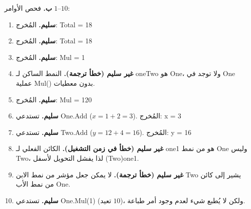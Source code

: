 \filbreak

\begin{boxSolution}
\textbf{ب.} فحص الأوامر $1$–$10$:
\begin{enumerate}[label=\textbf{\arabic*.}, itemsep=0.3em]
    \item \textbf{سليم.} المُخرج: \textenglish{Total = 18}
    \item \textbf{سليم.} المُخرج: \textenglish{Total = 18}
    \item \textbf{سليم.} المُخرج: \textenglish{Mul = 1}
    \item \textbf{غير سليم (خطأ ترجمة).} النمط الساكن لـ \textenglish{oneTwo} هو \textenglish{One}، ولا توجد في \textenglish{One} عملية \textenglish{Mul()} بدون معطيات.
    \item \textbf{سليم.} المُخرج: \textenglish{Mul = 120}
    \item \textbf{سليم.} تستدعي \textenglish{One.Add} ($x = 1 + 2 = 3$). المُخرج: \textenglish{x = 3}
    \item \textbf{سليم.} تستدعي \textenglish{Two.Add} ($y = 12 + 4 = 16$). المُخرج: \textenglish{y = 16}
    \item \textbf{غير سليم (خطأ في زمن التشغيل).} الكائن الفعلي لـ \textenglish{one1} هو من نمط \textenglish{One} وليس \textenglish{Two}، لذا يفشل التحويل لأسفل \textenglish{(Two)one1}.
    \item \textbf{غير سليم (خطأ ترجمة).} لا يمكن جعل مؤشر من نمط الابن \textenglish{Two} يشير إلى كائن من نمط الأب \textenglish{One}.
    \item \textbf{سليم.} تستدعي \textenglish{One.Mul(1)} (تعيد $10$)، ولكن لا يُطبع شيء لعدم وجود أمر طباعة.
\end{enumerate}
\end{boxSolution}
\fi
\filbreak
